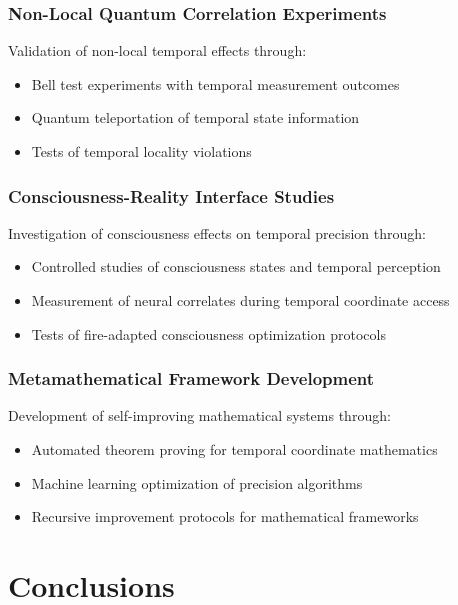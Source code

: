 \documentclass[12pt,a4paper]{article}
\begin{document}
{{{{{{{{{{{{{{\subsubsection{Non-Local Quantum Correlation Experiments}

Validation of non-local temporal effects through:

\begin{itemize}
\item Bell test experiments with temporal measurement outcomes
\item Quantum teleportation of temporal state information
\item Tests of temporal locality violations
\end{itemize}

\subsubsection{Consciousness-Reality Interface Studies}

Investigation of consciousness effects on temporal precision through:

\begin{itemize}
\item Controlled studies of consciousness states and temporal perception
\item Measurement of neural correlates during temporal coordinate access
\item Tests of fire-adapted consciousness optimization protocols
\end{itemize}

\subsubsection{Metamathematical Framework Development}

Development of self-improving mathematical systems through:

\begin{itemize}
\item Automated theorem proving for temporal coordinate mathematics
\item Machine learning optimization of precision algorithms
\item Recursive improvement protocols for mathematical frameworks
\end{itemize}

\section{Conclusions}

}}}}}}}}}}}}}}
\end{document}
